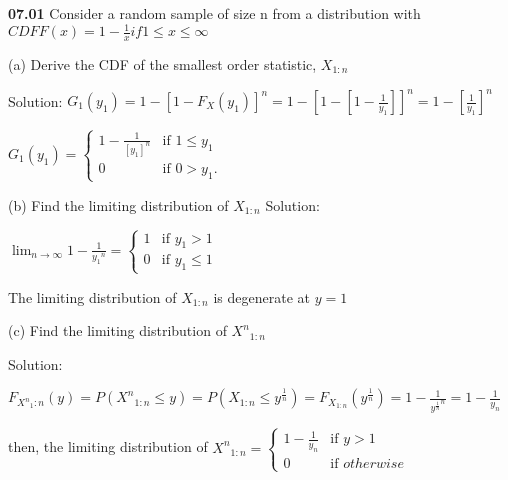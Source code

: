 {\bf 07.01} Consider a random sample of size n from a distribution with $CDF F(x) = 1-\frac{1}{x} if 1 \leq x \leq \infty$

\vspace{5mm}

(a)  Derive the CDF of the smallest order statistic, $X_{1 \colon n}$

\vspace{3mm}
Solution: $G_{1}(y_1) = 1-[1-F_X(y_1)]^n  = 1-[1-[1-\frac{1}{y_1}]]^n = 1-[\frac{1}{y_1}]^n$

\vspace{2mm}
$G_1(y_1) = \begin{cases} 1-\frac{1}{[y_1]^n} &\mbox{if }  1\leq y_1 \\ 0 &\mbox{if } 0>y_1. \end{cases} $


\vspace{10mm}
(b) Find the limiting distribution of $ X_{1\colon{n}}$
\vspace{3mm}
Solution: 

\vspace{2mm}
$\lim_{n \rightarrow \infty} 1-\frac{1}{{y_1}^n} = \begin{cases} 1 &\mbox{if } y_{1} > 1 \\ 0 &\mbox{if } y_1 \leq 1 \end{cases}$

\vspace{2mm}
The limiting distribution of $X_{1\colon n}$ is degenerate at $y = 1$

\vspace{10mm}
(c) Find the limiting distribution of ${X^n}_{1\colon n}$

\vspace{3mm}
Solution:

\vspace{2mm}
$F_{{X^n}_1\colon n} (y) = P({X^n}_{1\colon n} \leq y) = P(X_{1\colon n} \leq y^{\frac{1}{n}}) = F_{X_{1\colon n}} (y^{\frac{1}{n}}) = 1-\frac{1}{{y^\frac{1}{n}}^n} = 1 - \frac{1}{y_n}$

\vspace{2mm}
then, the limiting distribution of ${X^n}_{1\colon n} = \begin{cases} 1- \frac{1}{y_n} &\mbox {if } y >1 \\ 0 &\mbox {if } otherwise \end{cases}$ \\
